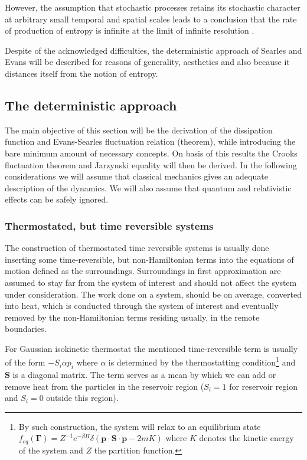 \documentclass[a4paper,12pt]{article}
\begin{document}
However, the assumption that stochastic processes retains its stochastic character at arbitrary small temporal and spatial scales leads to a conclusion that the rate of production of entropy is infinite at the limit of infinite resolution \cite{Dorfman:ozm67-zD}.

Despite of the acknowledged difficulties, the deterministic approach of Searles and Evans will be described for reasons of generality, aesthetics and also because it distances itself from the notion of entropy.

\subsection{The deterministic approach}


The main objective of this section will be the derivation of the dissipation function and Evans-Searles fluctuation relation (theorem), while introducing the bare minimum amount of necessary concepts. On basis of this results the Crooks fluctuation theorem and Jarzynski equality will then be derived. In the following considerations we will assume that classical mechanics gives an adequate description of the dynamics. We will also assume that quantum and relativistic effects can be safely ignored.

\subsubsection{Thermostated, but time reversible systems}

The construction of thermostated time reversible systems is usually done inserting some time-reversible, but non-Hamiltonian terms into the equations of motion defined as the surroundings. Surroundings in first approximation are assumed to stay far from the system of interest and should not affect the system under consideration.
The work done on a system, should be on average, converted into heat, which is conducted through the system of interest and eventually removed by the non-Hamiltonian terms residing usually, in the remote boundaries.

For Gaussian isokinetic thermostat the mentioned time-reversible term is usually of the form $- S_i \alpha p_i $ where $\alpha$ is determined by the thermostatting condition\footnote{By such construction, the system will relax to an equilibrium state $f_{eq}(\bm{\Gamma})=Z^{-1} e^{-\beta H}\delta(\bm{p}\cdot \bm{S}\cdot \bm{p}-2m K)$ where $K$ denotes the kinetic energy of the system and $Z$ the partition function.}
 and $\textbf{S}$ is a diagonal matrix. The term serves as a mean by which we can add or remove heat from the particles in the reservoir region ($S_i =1$ for reservoir region and $S_i = 0$ outside this region).
\end{document}
